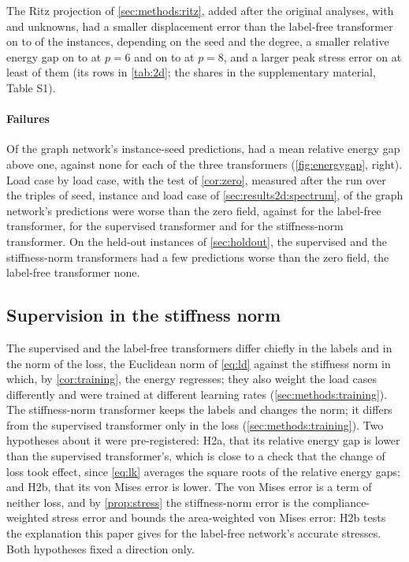 The Ritz projection of \cref{sec:methods:ritz}, added after the original analyses, with
\numRitzTwoKSix{} and \numRitzTwoKEight{} unknowns, had a smaller displacement error than
the label-free transformer on \numRitzTwoFreeDispMin{} to \numRitzTwoFreeDispMax{} of the
instances, depending on the seed and the degree, a smaller relative energy gap on
\numRitzTwoFreeGapSixMin{} to \numRitzTwoFreeGapSixMax{} at $p=6$ and on
\numRitzTwoFreeGapEightMin{} to \numRitzTwoFreeGapEightMax{} at $p=8$, and a larger peak
stress error on at least \numRitzTwoFreePeakMin{} of them (its rows in \cref{tab:2d}; the
shares in the supplementary material, Table S1).

\paragraph{Failures}
Of the graph network's \numCmPairs{} instance-seed predictions, \numCmMgnWorse{} had a mean
relative energy gap above one, against none for each of the three transformers
(\cref{fig:energygap}, right). Load case by load case, with the test of \cref{cor:zero},
measured after the run over the \numSpecLoads{} triples of seed, instance and load case of
\cref{sec:results2d:spectrum}, \numSpecLoadWorseMgn{} of the graph network's predictions
were worse than the zero field, against \numSpecLoadWorseFree{} for the label-free
transformer, \numSpecLoadWorseLab{} for the supervised transformer and
\numSpecLoadWorseKnorm{} for the stiffness-norm transformer. On the held-out instances of
\cref{sec:holdout}, the supervised and the stiffness-norm transformers had a few predictions
worse than the zero field, the label-free transformer none.

\subsection{Supervision in the stiffness norm}\label{sec:results2d:norm}

The supervised and the label-free transformers differ chiefly in the labels and in the norm
of the loss, the Euclidean norm of \eqref{eq:ld} against the stiffness norm in which, by
\cref{cor:training}, the energy regresses; they also weight the load cases differently and
were trained at different learning rates (\cref{sec:methods:training}). The stiffness-norm
transformer keeps the labels and changes the norm; it differs from the supervised
transformer only in the loss (\cref{sec:methods:training}). Two hypotheses about it were
pre-registered: H2a, that its relative energy gap is lower than the supervised
transformer's, which is close to a check that the change of loss took effect, since
\eqref{eq:lk} averages the square roots of the relative energy gaps; and H2b, that its von
Mises error is lower. The von Mises error is a term of neither loss, and by
\cref{prop:stress} the stiffness-norm error is the compliance-weighted stress error and
bounds the area-weighted von Mises error: H2b tests the explanation this paper gives for the
label-free network's accurate stresses. Both hypotheses fixed a direction only.

